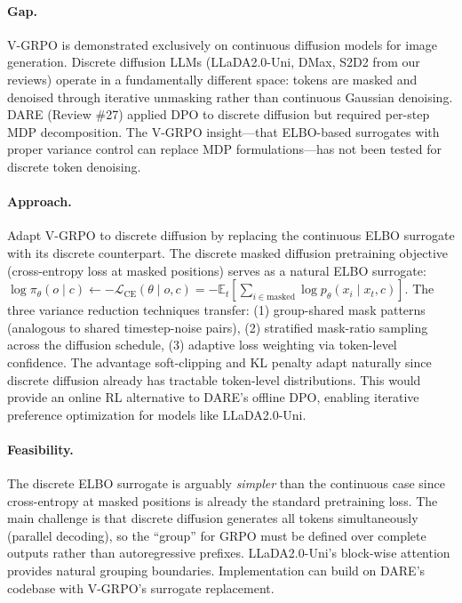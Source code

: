 \documentclass[11pt]{article}
\begin{document}
\paragraph{Gap.}
V-GRPO is demonstrated exclusively on continuous diffusion models for image generation. Discrete diffusion LLMs (LLaDA2.0-Uni, DMax, S2D2 from our reviews) operate in a fundamentally different space: tokens are masked and denoised through iterative unmasking rather than continuous Gaussian denoising. DARE (Review \#27) applied DPO to discrete diffusion but required per-step MDP decomposition. The V-GRPO insight---that ELBO-based surrogates with proper variance control can replace MDP formulations---has not been tested for discrete token denoising.

\paragraph{Approach.}
Adapt V-GRPO to discrete diffusion by replacing the continuous ELBO surrogate with its discrete counterpart. The discrete masked diffusion pretraining objective (cross-entropy loss at masked positions) serves as a natural ELBO surrogate: $\log \pi_\theta(o \mid c) \leftarrow -\mathcal{L}_{\mathrm{CE}}(\theta \mid o, c) = -\mathbb{E}_t\!\left[\sum_{i \in \mathrm{masked}} \log p_\theta(x_i \mid x_t, c)\right]$. The three variance reduction techniques transfer: (1) group-shared mask patterns (analogous to shared timestep-noise pairs), (2) stratified mask-ratio sampling across the diffusion schedule, (3) adaptive loss weighting via token-level confidence. The advantage soft-clipping and KL penalty adapt naturally since discrete diffusion already has tractable token-level distributions. This would provide an online RL alternative to DARE's offline DPO, enabling iterative preference optimization for models like LLaDA2.0-Uni.

\paragraph{Feasibility.}
The discrete ELBO surrogate is arguably \emph{simpler} than the continuous case since cross-entropy at masked positions is already the standard pretraining loss. The main challenge is that discrete diffusion generates all tokens simultaneously (parallel decoding), so the ``group'' for GRPO must be defined over complete outputs rather than autoregressive prefixes. LLaDA2.0-Uni's block-wise attention provides natural grouping boundaries. Implementation can build on DARE's codebase with V-GRPO's surrogate replacement.
\end{document}
